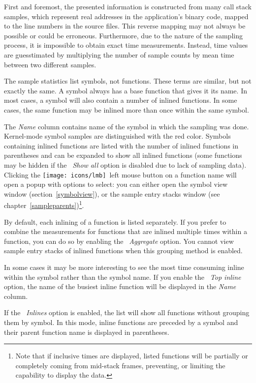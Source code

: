 \documentclass[hidelinks,titlepage,a4paper,twoside]{article}
\newcommand{\LMB}{\texttt{[image: icons/lmb]}}
\begin{document}
First and foremost, the presented information is constructed from many call stack samples, which represent real addresses in the application's binary code, mapped to the line numbers in the source files. This reverse mapping may not always be possible or could be erroneous. Furthermore, due to the nature of the sampling process, it is impossible to obtain exact time measurements. Instead, time values are guesstimated by multiplying the number of sample counts by mean time between two different samples.

The sample statistics list symbols, not functions. These terms are similar, but not exactly the same. A symbol always has a base function that gives it its name. In most cases, a symbol will also contain a number of inlined functions. In some cases, the same function may be inlined more than once within the same symbol.

The \emph{Name} column contains name of the symbol in which the sampling was done. Kernel-mode symbol samples are distinguished with the red color. Symbols containing inlined functions are listed with the number of inlined functions in parentheses and can be expanded to show all inlined functions (some functions may be hidden if the \emph{\faPuzzlePiece{}~Show all} option is disabled due to lack of sampling data). Clicking the \LMB{}~left mouse button on a function name will open a popup with options to select: you can either open the symbol view window (section~\ref{symbolview}), or the sample entry stacks window (see chapter~\ref{sampleparents})\footnote{Note that if inclusive times are displayed, listed functions will be partially or completely coming from mid-stack frames, preventing, or limiting the capability to display the data.}.

By default, each inlining of a function is listed separately. If you prefer to combine the measurements for functions that are inlined multiple times within a function, you can do so by enabling the \emph{\faLayerGroup{}~Aggregate} option. You cannot view sample entry stacks of inlined functions when this grouping method is enabled.

In some cases it may be more interesting to see the most time consuming inline within the symbol rather than the symbol name. If you enable the \emph{\faFire*~Top inline} option, the name of the busiest inline function will be displayed in the \emph{Name} column.

If the \emph{\faSitemap{}~Inlines} option is enabled, the list will show all functions without grouping them by symbol. In this mode, inline functions are preceded by a \faCaretRight{} symbol and their parent function name is displayed in parentheses.
\end{document}
